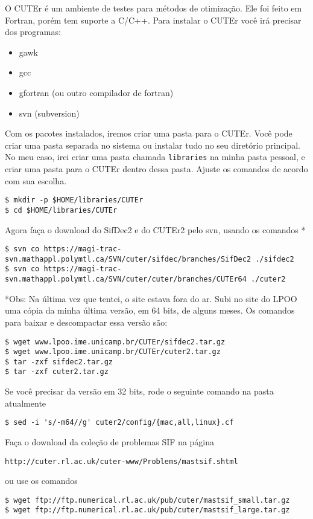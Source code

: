 \documentclass[letterpaper,11pt]{article}
\numberwithin{equation}{section}
\begin{document}
O CUTEr é um ambiente de testes para métodos de otimização. 
Ele foi feito em Fortran, porém tem suporte a C/C++.
Para instalar o CUTEr você irá precisar dos programas:
\begin{itemize}
 \item gawk 
 \item gcc 
 \item gfortran (ou outro compilador de fortran)
 \item svn (subversion)
\end{itemize}
Com os pacotes instalados, iremos criar uma pasta para o CUTEr. Você pode criar uma
pasta separada no sistema ou instalar tudo no seu diretório principal. No meu caso,
irei criar uma pasta chamada \verb+libraries+ na minha pasta pessoal, e criar uma
pasta para o CUTEr dentro dessa pasta. Ajuste os comandos de acordo com sua escolha.
\begin{verbatim}
$ mkdir -p $HOME/libraries/CUTEr
$ cd $HOME/libraries/CUTEr
\end{verbatim}
Agora faça o download do SifDec2 e do CUTEr2 pelo svn, usando os comandos{\color{red} *}
\small
\begin{verbatim}
$ svn co https://magi-trac-svn.mathappl.polymtl.ca/SVN/cuter/sifdec/branches/SifDec2 ./sifdec2 
$ svn co https://magi-trac-svn.mathappl.polymtl.ca/SVN/cuter/cuter/branches/CUTEr64 ./cuter2
\end{verbatim}
{\color{red}*Obs: Na última vez que tentei, o site estava fora do ar. Subi no site do LPOO
uma cópia da minha última versão, em 64 bits, de alguns meses. Os comandos para baixar e
 descompactar
essa versão são:
\begin{verbatim}
$ wget www.lpoo.ime.unicamp.br/CUTEr/sifdec2.tar.gz
$ wget www.lpoo.ime.unicamp.br/CUTEr/cuter2.tar.gz
$ tar -zxf sifdec2.tar.gz
$ tar -zxf cuter2.tar.gz
\end{verbatim}
Se você precisar da versão em 32 bits, rode o seguinte comando na pasta atualmente
\begin{verbatim}
$ sed -i 's/-m64//g' cuter2/config/{mac,all,linux}.cf
\end{verbatim}
}
\normalsize
Faça o download da coleção de problemas SIF na página
\begin{verbatim}
http://cuter.rl.ac.uk/cuter-www/Problems/mastsif.shtml
\end{verbatim}
ou use os comandos
\begin{verbatim}
$ wget ftp://ftp.numerical.rl.ac.uk/pub/cuter/mastsif_small.tar.gz 
$ wget ftp://ftp.numerical.rl.ac.uk/pub/cuter/mastsif_large.tar.gz
\end{verbatim}
\end{document}
